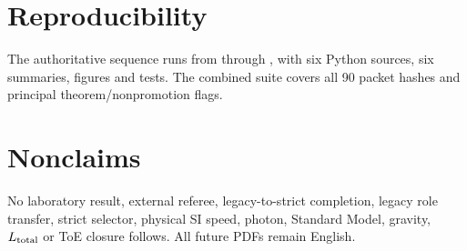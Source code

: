 \documentclass[11pt,a4paper]{article}
\begin{document}
\appendix
\section{Reproducibility}
The authoritative sequence runs from  through , with six Python sources, six summaries, figures and tests. The combined suite covers all 90 packet hashes and principal theorem/nonpromotion flags.

\section{Nonclaims}
No laboratory result, external referee, legacy-to-strict completion, legacy role transfer, strict selector, physical SI speed, photon, Standard Model, gravity, $L_{\rm total}$ or ToE closure follows. All future PDFs remain English.
\end{document}
